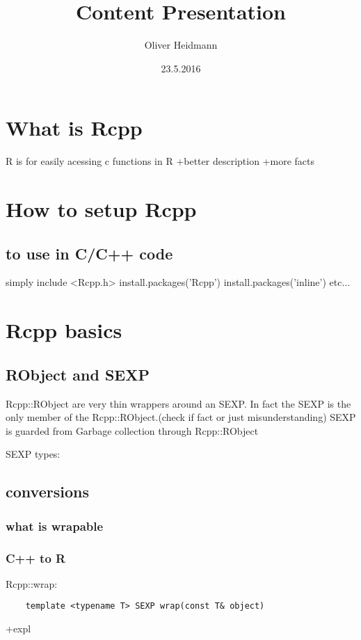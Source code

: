 \documentclass{article}
\title{Content Presentation}
\date{23.5.2016}
\author{Oliver Heidmann}
\begin{document}
\maketitle
\newpage
\tableofcontents
\newpage

\section{What is Rcpp}

    R is for easily acessing c functions in R
    +better description
    +more facts
\section{How to setup Rcpp}

    \subsection{to use in C/C++ code}
        simply include \textless Rcpp.h\textgreater
        \newline
        install.packages('Rcpp')
        \newline
        install.packages('inline')
        etc...

\section{Rcpp basics}
    \subsection{RObject and SEXP}
        Rcpp::RObject are very thin wrappers around an SEXP. 
        In fact the SEXP is the only member of the Rcpp::RObject.(check if fact or just
        misunderstanding)
        \newline
        SEXP is guarded from Garbage collection through Rcpp::RObject

        SEXP types:
            
    \subsection{conversions}
        \subsubsection{what is wrapable}
        \subsubsection{C++ to R}
            Rcpp::wrap:
            \begin{verbatim}
    template <typename T> SEXP wrap(const T& object)
            \end{verbatim}
            +expl
\end{document}
